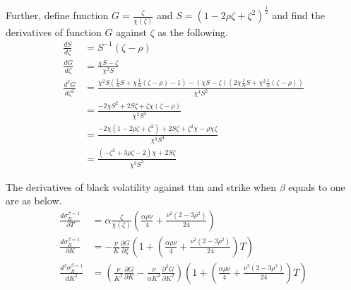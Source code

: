 \documentclass{article}
\begin{document}
Further, define function $ G = \frac{\zeta}{\chi\left(\zeta\right)} $ and $ S = \left(1 - 2 \rho \zeta + \zeta^2\right)^{\frac{1}{2}} $ and find the derivatives of function $ G $ against $ \zeta $ as the following.
\begin{subequations}
    \begin{align}
        \frac{d S}{d \zeta} &= S^{-1} \left(\zeta - \rho\right) \\
        \frac{d G}{d \zeta} &= \frac{\chi S - \zeta}{\chi^2 S} \\
        \frac{d^2 G}{d \zeta^2} &= \frac{\chi^2 S \left(\frac{1}{S} S + \chi \frac{1}{S} \left(\zeta - \rho\right) - 1\right) - \left(\chi S - \zeta\right) \left(2 \chi \frac{1}{S} S + \chi^2 \frac{1}{S} \left(\zeta - \rho\right)\right)}{\chi^4 S^2} \nonumber \\
        &= \frac{-2 \chi S^2 + 2 S \zeta + \zeta \chi \left(\zeta - \rho\right)}{\chi^3 S^3} \nonumber \\
        &= \frac{-2 \chi \left(1 - 2\rho \zeta + \zeta^2\right) + 2 S \zeta + \zeta^2 \chi - \rho \chi \zeta}{\chi^3 S^3} \nonumber \\
        &= \frac{\left(-\zeta^2 + 3 \rho \zeta - 2\right) \chi + 2 S \zeta}{\chi^3 S^3}
    \end{align}
\end{subequations}

The derivatives of black volatility against ttm and strike when $ \beta $ equals to one are as below.
\begin{subequations}
    \begin{align}
        \frac{d \sigma_{B}^{\beta=1}}{\partial T} &= \alpha \frac{\zeta}{\chi \left(\zeta\right)} \left(\frac{\alpha \rho \nu}{4} + \frac{\nu^2 \left(2 - 3 \rho^2\right)}{24}\right) \label{dSigdT} \\
        \frac{d \sigma_{B}^{\beta=1}}{\partial K} &= -\frac{\nu}{K} \frac{\partial G}{\partial \zeta} \left(1 + \left(\frac{\alpha \rho \nu}{4} + \frac{\nu^2 \left(2 - 3 \rho^2\right)}{24}\right) T\right) \label{dSigdK} \\
        \frac{d^2 \sigma_{B}^{\beta=1}}{d K^2} &= \left(\frac{\nu}{K^2} \frac{\partial G}{\partial K} - \frac{\nu}{\alpha K^2} \frac{\partial^2 G}{\partial K^2}\right) \left(1 + \left(\frac{\alpha \rho \nu}{4} + \frac{\nu^2 \left(2 - 3 \rho^2\right)}{24}\right) T\right) \label{dSig2dK2}
    \end{align}
\end{subequations}
\end{document}
